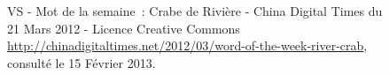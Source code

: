 \begin{figure}[htbp]
    \centering
    \caption[Hexie, les crabes de rivières]{  VS  - Mot de la semaine : Crabe de Rivière - China Digital Times du 21 Mars 2012 - Licence Creative Commons \url{http://chinadigitaltimes.net/2012/03/word-of-the-week-river-crab}, consulté le 15 Février 2013.}

\label{fig:hexie}
\end{figure}

